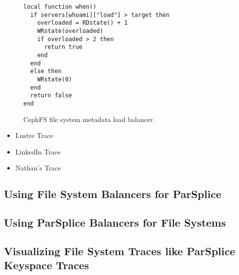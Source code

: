\begin{figure}[t]
\footnotesize
\begin{verbatim}
local function when()
  if servers[whoami]["load"] > target then
    overloaded = RDstate() + 1
    WRstate(overloaded)
    if overloaded > 2 then
      return true
    end
  end
  else then
    WRstate(0)
  end
  return false
end
\end{verbatim}
\caption{CephFS file system metadata load balancer.\label{lua:cephfs}}
\end{figure}

\begin{itemize}
  \item Lustre Trace
  \item LinkedIn Trace
  \item Nathan's Trace
\end{itemize}

\subsection{Using File System Balancers for ParSplice}
\subsection{Using ParSplice Balancers for File Systems}
\subsection{Visualizing File System Traces like ParSplice Keyspace Traces}
